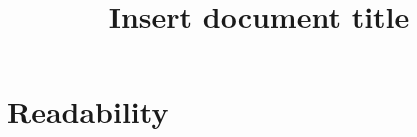 \documentclass{scrartcl}
\begin{document}
\title{Insert document title}
\maketitle

\section{Readability}\label{sec:readability}

\printbibliography
\end{document}
